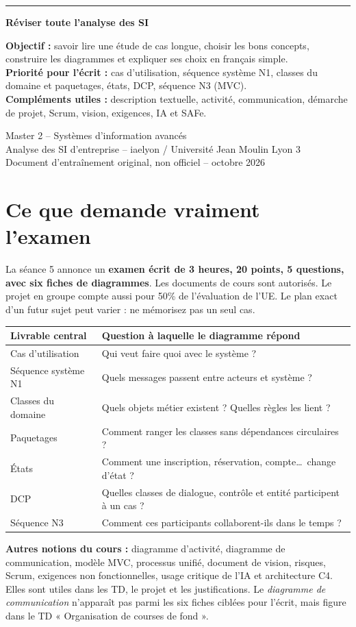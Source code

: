 \documentclass[10pt,a4paper]{article}
\newcommand{\cover}[3]{
\thispagestyle{empty}
\vspace*{27mm}
{\color{teal}\rule{25mm}{3pt}}\par\vspace{12mm}
{\huge\bfseries\color{navy} #1\par}
\vspace{5mm}{\Large\color{teal}#2\par}
\vspace{13mm}\begin{tcolorbox}[colback=pale,colframe=teal!40,boxrule=.3pt]
#3
\end{tcolorbox}
\vfill
{\small\color{bodygray} Master 2 -- Systèmes d'information avancés\\
Analyse des SI d'entreprise -- iaelyon / Université Jean Moulin Lyon 3\\
Document d'entraînement original, non officiel -- octobre 2026}
\newpage
}
\begin{document}
\cover{Réviser toute l'analyse des SI}{Cours clair + cas difficiles + schémas UML}{\textbf{Objectif :} savoir lire une étude de cas longue, choisir les bons concepts, construire les diagrammes et expliquer ses choix en français simple.\\[3pt]
\textbf{Priorité pour l'écrit :} cas d'utilisation, séquence système N1, classes du domaine et paquetages, états, DCP, séquence N3 (MVC).\\[3pt]
\textbf{Compléments utiles :} description textuelle, activité, communication, démarche de projet, Scrum, vision, exigences, IA et SAFe.}
\tableofcontents
\newpage

\section{Ce que demande vraiment l'examen}
\begin{memo}
La séance 5 annonce un \textbf{examen écrit de 3 heures, 20 points, 5 questions, avec six fiches de diagrammes}. Les documents de cours sont autorisés. Le projet en groupe compte aussi pour 50\% de l'évaluation de l'UE. Le plan exact d'un futur sujet peut varier : ne mémorisez pas un seul cas.
\end{memo}
\begin{tabularx}{\linewidth}{@{}p{39mm}X@{}}
\toprule
Livrable central & Question à laquelle le diagramme répond \\
\midrule
Cas d'utilisation & Qui veut faire quoi avec le système ? \\
Séquence système N1 & Quels messages passent entre acteurs et système ? \\
Classes du domaine & Quels objets métier existent ? Quelles règles les lient ? \\
Paquetages & Comment ranger les classes sans dépendances circulaires ? \\
États & Comment une inscription, réservation, compte\ldots\ change d'état ? \\
DCP & Quelles classes de dialogue, contrôle et entité participent à un cas ? \\
Séquence N3 & Comment ces participants collaborent-ils dans le temps ? \\
\bottomrule
\end{tabularx}

\textbf{Autres notions du cours :} diagramme d'activité, diagramme de communication, modèle MVC, processus unifié, document de vision, risques, Scrum, exigences non fonctionnelles, usage critique de l'IA et architecture C4. Elles sont utiles dans les TD, le projet et les justifications. Le \textit{diagramme de communication} n'apparaît pas parmi les six fiches ciblées pour l'écrit, mais figure dans le TD « Organisation de courses de fond ».
\end{document}

